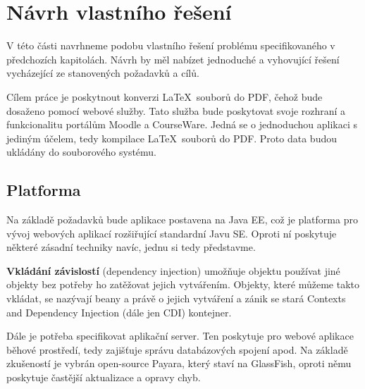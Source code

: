 \chapter{Návrh vlastního řešení}  

V této části navrhneme podobu vlastního řešení problému specifikovaného v předchozích kapitolách. Návrh by měl nabízet jednoduché a vyhovující řešení vycházející ze stanovených požadavků a cílů. 
\par
Cílem práce je poskytnout konverzi \LaTeX\ souborů do PDF, čehož bude dosaženo pomocí webové služby. Tato služba bude poskytovat svoje rozhraní a funkcionalitu portálům Moodle a CourseWare. Jedná se o jednoduchou aplikaci s jediným účelem, tedy kompilace \LaTeX\ souborů do PDF. Proto data budou ukládány do souborového systému.

\section{Platforma} \label{platforma}
Na základě požadavků bude aplikace postavena na Java EE\cite{javaee}, což je platforma pro vývoj webových aplikací rozšiřující standardní Javu SE. Oproti ní poskytuje některé zásadní techniky navíc, jednu si tedy představme. 
\par
\textbf{Vkládání závislostí} (dependency injection) umožňuje objektu používat jiné objekty bez potřeby ho zatěžovat jejich vytvářením. Objekty, které můžeme takto vkládat, se nazývají beany a právě o jejich vytváření a zánik se stará Contexts and Dependency Injection (dále jen CDI) kontejner.
\\[12pt]
\par
Dále je potřeba specifikovat aplikační server. Ten poskytuje pro webové aplikace běhové prostředí, tedy zajišťuje správu databázových spojení apod. Na základě zkušeností je vybrán open-source Payara, který staví na GlassFish, oproti němu poskytuje častější aktualizace a opravy chyb. 

